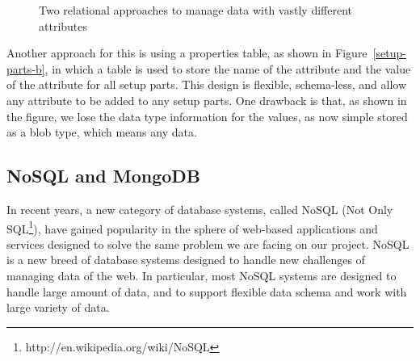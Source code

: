 \begin{figure}[h]
    \centering
    \caption{Two relational approaches to manage data with vastly different attributes}
    \label{setup-parts}
\end{figure}

 Another approach for this is using a properties table, as shown in Figure~\ref{setup-parts-b}, in which a table is used to store the name of the attribute and the value of the attribute for all setup parts. This design is flexible, schema-less, and allow any attribute to be added to any setup parts. One drawback is that, as shown in the figure, we lose the data type information for the values, as now simple stored as a blob type, which means any data.

\subsection{NoSQL and MongoDB}

In recent years, a new category of database systems, called NoSQL (Not Only SQL\footnote{http://en.wikipedia.org/wiki/NoSQL}), have gained popularity in the sphere of web-based applications and services designed to solve the same problem we are facing on our project. NoSQL is a new breed of database systems designed to handle new challenges of managing data of the web. In particular, most NoSQL systems are designed to handle large amount of data, and to support flexible data schema and work with large variety of data\cite{Stonebraker2010}.

